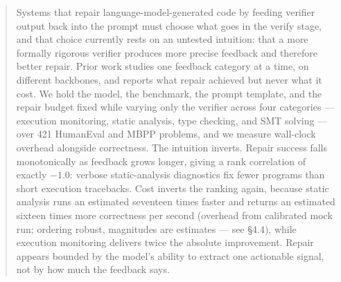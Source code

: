 \begin{abstract}
Systems that repair language-model-generated code by feeding verifier output back into the prompt must choose what goes in the verify stage, and that choice currently rests on an untested intuition: that a more formally rigorous verifier produces more precise feedback and therefore better repair. Prior work studies one feedback category at a time, on different backbones, and reports what repair achieved but never what it cost. We hold the model, the benchmark, the prompt template, and the repair budget fixed while varying only the verifier across four categories --- execution monitoring, static analysis, type checking, and SMT solving --- over 421 HumanEval and MBPP problems, and we measure wall-clock overhead alongside correctness. The intuition inverts. Repair success falls monotonically as feedback grows longer, giving a rank correlation of exactly $-1.0$: verbose static-analysis diagnostics fix fewer programs than short execution tracebacks. Cost inverts the ranking again, because static analysis runs an estimated seventeen times faster and returns an estimated sixteen times more correctness per second (overhead from calibrated mock run; ordering robust, magnitudes are estimates --- see \S4.4), while execution monitoring delivers twice the absolute improvement. Repair appears bounded by the model's ability to extract one actionable signal, not by how much the feedback says.
\end{abstract}
